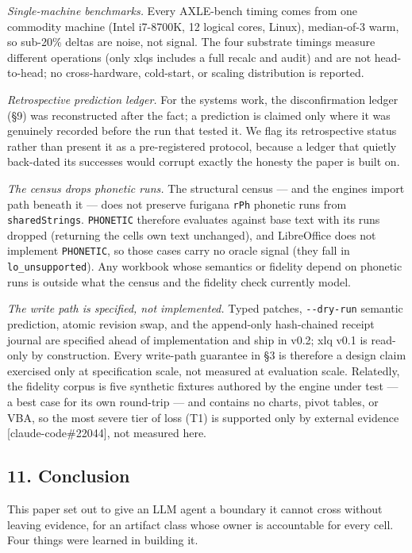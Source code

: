 \documentclass[
]{article}
\begin{document}
\emph{Single-machine benchmarks.} Every AXLE-bench timing comes from one
commodity machine (Intel i7-8700K, 12 logical cores, Linux), median-of-3
warm, so sub-20\% deltas are noise, not signal. The four substrate
timings measure different operations (only xlq\textquotesingle s
includes a full recalc and audit) and are not head-to-head; no
cross-hardware, cold-start, or scaling distribution is reported.

\emph{Retrospective prediction ledger.} For the systems work, the
disconfirmation ledger (§9) was reconstructed after the fact; a
prediction is claimed only where it was genuinely recorded before the
run that tested it. We flag its retrospective status rather than present
it as a pre-registered protocol, because a ledger that quietly
back-dated its successes would corrupt exactly the honesty the paper is
built on.

\emph{The census drops phonetic runs.} The structural census --- and the
engine\textquotesingle s import path beneath it --- does not preserve
furigana \texttt{rPh} phonetic runs from \texttt{sharedStrings}.
\texttt{PHONETIC} therefore evaluates against base text with its runs
dropped (returning the cell\textquotesingle s own text unchanged), and
LibreOffice does not implement \texttt{PHONETIC}, so those cases carry
no oracle signal (they fall in \texttt{lo\_unsupported}). Any workbook
whose semantics or fidelity depend on phonetic runs is outside what the
census and the fidelity check currently model.

\emph{The write path is specified, not implemented.} Typed patches,
\texttt{-\/-dry-run} semantic prediction, atomic revision swap, and the
append-only hash-chained receipt journal are specified ahead of
implementation and ship in v0.2; xlq v0.1 is read-only by construction.
Every write-path guarantee in §3 is therefore a design claim exercised
only at specification scale, not measured at evaluation scale.
Relatedly, the fidelity corpus is five synthetic fixtures authored by
the engine under test --- a best case for its own round-trip --- and
contains no charts, pivot tables, or VBA, so the most severe tier of
loss (T1) is supported only by external evidence
{[}claude-code\#22044{]}, not measured here.

\subsection{11. Conclusion}\label{11-conclusion}

This paper set out to give an LLM agent a boundary it cannot cross
without leaving evidence, for an artifact class whose owner is
accountable for every cell. Four things were learned in building it.
\end{document}
